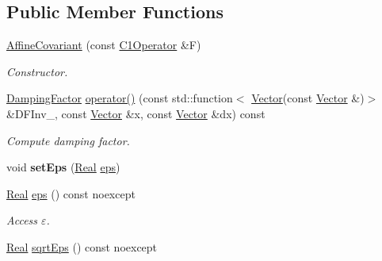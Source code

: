 \subsection*{\-Public \-Member \-Functions}
\begin{DoxyCompactItemize}
\item 
\hypertarget{classSpacy_1_1Newton_1_1Damping_1_1AffineCovariant_abf3615a91c70a145759d74eff761ec51}{\hyperlink{classSpacy_1_1Newton_1_1Damping_1_1AffineCovariant_abf3615a91c70a145759d74eff761ec51}{\-Affine\-Covariant} (const \hyperlink{classSpacy_1_1C1Operator}{\-C1\-Operator} \&\-F)}\label{classSpacy_1_1Newton_1_1Damping_1_1AffineCovariant_abf3615a91c70a145759d74eff761ec51}

\begin{DoxyCompactList}\small\item\em \-Constructor. \end{DoxyCompactList}\item 
\hypertarget{classSpacy_1_1Newton_1_1Damping_1_1AffineCovariant_a451040d8a986f1ae912b34713ced26ec}{\hyperlink{classSpacy_1_1DampingFactor}{\-Damping\-Factor} \hyperlink{classSpacy_1_1Newton_1_1Damping_1_1AffineCovariant_a451040d8a986f1ae912b34713ced26ec}{operator()} (const std\-::function$<$ \hyperlink{classSpacy_1_1Vector}{\-Vector}(const \hyperlink{classSpacy_1_1Vector}{\-Vector} \&)$>$ \&\-D\-F\-Inv\-\_\-, const \hyperlink{classSpacy_1_1Vector}{\-Vector} \&x, const \hyperlink{classSpacy_1_1Vector}{\-Vector} \&dx) const }\label{classSpacy_1_1Newton_1_1Damping_1_1AffineCovariant_a451040d8a986f1ae912b34713ced26ec}

\begin{DoxyCompactList}\small\item\em \-Compute damping factor. \end{DoxyCompactList}\item 
\hypertarget{classSpacy_1_1Mixin_1_1Eps_a6b4c38a60848c0ab665fb3a81e181786}{void {\bfseries set\-Eps} (\hyperlink{classSpacy_1_1Real}{\-Real} \hyperlink{classSpacy_1_1Mixin_1_1Eps_a812b99b0abc1d78a34b4114907f23f52}{eps})}\label{classSpacy_1_1Mixin_1_1Eps_a6b4c38a60848c0ab665fb3a81e181786}

\item 
\hypertarget{classSpacy_1_1Mixin_1_1Eps_a812b99b0abc1d78a34b4114907f23f52}{\hyperlink{classSpacy_1_1Real}{\-Real} \hyperlink{classSpacy_1_1Mixin_1_1Eps_a812b99b0abc1d78a34b4114907f23f52}{eps} () const noexcept}\label{classSpacy_1_1Mixin_1_1Eps_a812b99b0abc1d78a34b4114907f23f52}

\begin{DoxyCompactList}\small\item\em \-Access $\varepsilon$. \end{DoxyCompactList}\item 
\hypertarget{classSpacy_1_1Mixin_1_1Eps_abd50a47b32614a950189855775a09d05}{\hyperlink{classSpacy_1_1Real}{\-Real} \hyperlink{classSpacy_1_1Mixin_1_1Eps_abd50a47b32614a950189855775a09d05}{sqrt\-Eps} () const noexcept}\label{classSpacy_1_1Mixin_1_1Eps_abd50a47b32614a950189855775a09d05}


\end{DoxyCompactItemize}
